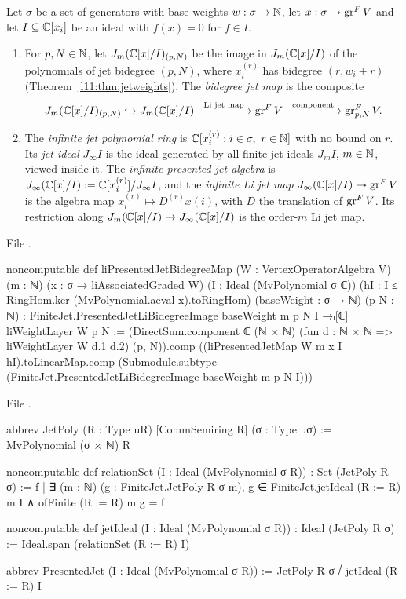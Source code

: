 \begin{definition}\label{l11:def:infjetmap}
Let $\sigma$ be a set of generators with base weights $w:\sigma\to{\mathbb{N}}$, let $x:\sigma\to\operatorname{gr}^FV$ and let $I\subseteq{\mathbb{C}}[x_i]$
be an ideal with $f(x)=0$ for $f\in I$.
\begin{enumerate}
\item For $p,N\in{\mathbb{N}}$, let $J_m({\mathbb{C}}[x]/I)_{(p,N)}$ be the image in $J_m({\mathbb{C}}[x]/I)$ of the polynomials of jet bidegree
  $(p,N)$, where $x_i^{(r)}$ has bidegree $(r,w_i+r)$ (Theorem~\ref{l11:thm:jetweights}). The \emph{bidegree jet map}
  is the composite
  \begin{equation*}
    J_m({\mathbb{C}}[x]/I)_{(p,N)}\hookrightarrow J_m({\mathbb{C}}[x]/I)\xrightarrow{\ \text{Li jet map}\ }\operatorname{gr}^FV
    \xrightarrow{\ \text{component}\ }\operatorname{gr}^F_{p,N}V .
  \end{equation*}
\item The \emph{infinite jet polynomial ring} is ${\mathbb{C}}[x_i^{(r)} : i\in\sigma,\ r\in{\mathbb{N}}]$ with no bound on $r$. Its
  \emph{jet ideal} $J_\infty I$ is the ideal generated by all finite jet ideals $J_mI$, $m\in{\mathbb{N}}$, viewed inside it.
  The \emph{infinite presented jet algebra} is $J_\infty({\mathbb{C}}[x]/I) := {\mathbb{C}}[x_i^{(r)}]/J_\infty I$, and the \emph{infinite
  Li jet map} $J_\infty({\mathbb{C}}[x]/I)\to\operatorname{gr}^FV$ is the algebra map $x_i^{(r)}\mapsto D^{(r)}x(i)$, with $D$ the
  translation of $\operatorname{gr}^FV$. Its restriction along $J_m({\mathbb{C}}[x]/I)\to J_\infty({\mathbb{C}}[x]/I)$ is the order-$m$ Li jet map.
\end{enumerate}
\end{definition}
\noindent File .
\begin{leancode}
noncomputable def liPresentedJetBidegreeMap
    (W : VertexOperatorAlgebra V) (m : ℕ)
    (x : σ → liAssociatedGraded W) (I : Ideal (MvPolynomial σ ℂ))
    (hI : I ≤ RingHom.ker (MvPolynomial.aeval x).toRingHom)
    (baseWeight : σ → ℕ) (p N : ℕ) :
    FiniteJet.PresentedJetLiBidegreeImage baseWeight m p N I →ₗ[ℂ]
      liWeightLayer W p N :=
  (DirectSum.component ℂ (ℕ × ℕ)
      (fun d : ℕ × ℕ => liWeightLayer W d.1 d.2) (p, N)).comp
    ((liPresentedJetMap W m x I hI).toLinearMap.comp
      (Submodule.subtype
        (FiniteJet.PresentedJetLiBidegreeImage baseWeight m p N I)))
\end{leancode}
\noindent File .
\begin{leancode}
abbrev JetPoly (R : Type uR) [CommSemiring R] (σ : Type uσ) :=
  MvPolynomial (σ × ℕ) R

noncomputable def relationSet (I : Ideal (MvPolynomial σ R)) : Set (JetPoly R σ) :=
  {f | ∃ (m : ℕ) (g : FiniteJet.JetPoly R σ m),
    g ∈ FiniteJet.jetIdeal (R := R) m I ∧ ofFinite (R := R) m g = f}

noncomputable def jetIdeal (I : Ideal (MvPolynomial σ R)) : Ideal (JetPoly R σ) :=
  Ideal.span (relationSet (R := R) I)

abbrev PresentedJet (I : Ideal (MvPolynomial σ R)) :=
  JetPoly R σ ⧸ jetIdeal (R := R) I
\end{leancode}
